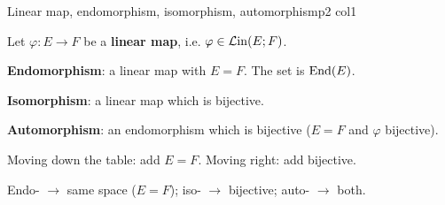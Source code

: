 \documentclass[course,noautoquant,noautokw]{neyvia-study}
\begin{document}
\begin{concept}[1.33]{Linear map, endomorphism, isomorphism, automorphism}{p2 col1}
\begin{definition}
\noindent Let $\varphi:E\to F$ be a \textbf{linear map}, i.e. $\varphi\in\mathcal{L}\mathrm{in}(E;F)$.
\par\noindent \textbf{Endomorphism}: a linear map with $E=F$. The set is $\operatorname{End}(E)$.
\par\noindent \textbf{Isomorphism}: a linear map which is bijective.
\par\noindent \textbf{Automorphism}: an endomorphism which is bijective ($E=F$ and $\varphi$ bijective).
\par\noindent Moving down the table: add $E=F$. Moving right: add bijective.
\end{definition}
\begin{reflex}
Endo- \ensuremath{\rightarrow} same space ($E=F$); iso- \ensuremath{\rightarrow} bijective; auto- \ensuremath{\rightarrow} both.
\end{reflex}
\begin{traps}
\end{traps}
\end{concept}
\end{document}

